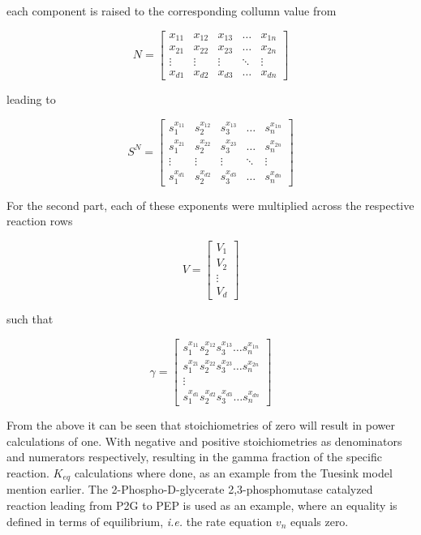 each component is raised to the corresponding collumn value from

\[
N 
=
\begin{bmatrix}
    x_{11} & x_{12} & x_{13} & \dots  & x_{1n} \\
    x_{21} & x_{22} & x_{23} & \dots  & x_{2n} \\
    \vdots & \vdots & \vdots & \ddots & \vdots \\
    x_{d1} & x_{d2} & x_{d3} & \dots  & x_{dn}
\end{bmatrix}
\]

leading to 

\[
S^N
=
\begin{bmatrix}
    s_1^{x_{11}} & s_2^{x_{12}} & s_3^{x_{13}} & \dots  & s_n^{x_{1n}} \\
    s_1^{x_{21}} & s_2^{x_{22}} & s_3^{x_{23}} & \dots  & s_n^{x_{2n}} \\
    \vdots & \vdots & \vdots & \ddots & \vdots \\
    s_1^{x_{d1}} & s_2^{x_{d2}} & s_3^{x_{d3}} & \dots  & s_n^{x_{dn}}
\end{bmatrix}
\]


For the second part, each of these exponents were multiplied across the respective reaction rows 

\[
V
=
\begin{bmatrix}
    V_{1} \\
    V_{2} \\
    \vdots \\
    V_{d} 
\end{bmatrix}
\]

such that

\[
\gamma 
=
\begin{bmatrix}
    s_1^{x_{11}}s_2^{x_{12}}s_3^{x_{13}} \dots s_n^{x_{1n}} \\
    s_1^{x_{21}}s_2^{x_{22}}s_3^{x_{23}} \dots s_n^{x_{2n}} \\
    \vdots\\
    s_1^{x_{d1}}s_2^{x_{d2}}s_3^{x_{d3}}\dots s_n^{x_{dn}}
\end{bmatrix}
\]

From the above it can be seen that stoichiometries of zero will result in power calculations of one. With negative and positive stoichiometries as denominators and numerators respectively, resulting in the gamma fraction \gamma of the specific reaction. $K_{eq}$ calculations where done, as an example from the Tuesink model mention earlier. The 2-Phospho-D-glycerate 2,3-phosphomutase catalyzed reaction leading from P2G to PEP is used as an example, where an equality is defined in terms of equilibrium, \textit{i.e.} the rate equation $v_n$ equals zero.


